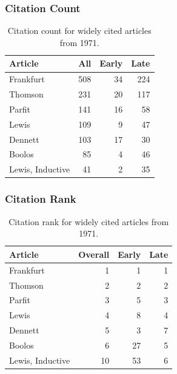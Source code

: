 \documentclass[
  10pt,
  letterpaper,
  DIV=11,
  numbers=noendperiod,
  twoside]{scrartcl}
\begin{document}
\subsubsection*{Citation Count}\label{sec-count-1971}

\begin{longtable}[]{@{}lrrr@{}}

\caption{\label{tbl-citation-count-1971}Citation count for widely cited
articles from 1971.}

\tabularnewline

\toprule\noalign{}
Article & All & Early & Late \\
\midrule\noalign{}
\endhead
\bottomrule\noalign{}
\endlastfoot
Frankfurt & 508 & 34 & 224 \\
Thomson & 231 & 20 & 117 \\
Parfit & 141 & 16 & 58 \\
Lewis & 109 & 9 & 47 \\
Dennett & 103 & 17 & 30 \\
Boolos & 85 & 4 & 46 \\
Lewis, Inductive & 41 & 2 & 35 \\

\end{longtable}

\subsubsection*{Citation Rank}\label{sec-rank-1971}

\begin{longtable}[]{@{}lrrr@{}}

\caption{\label{tbl-citation-rank-1971}Citation rank for widely cited
articles from 1971.}

\tabularnewline

\toprule\noalign{}
Article & Overall & Early & Late \\
\midrule\noalign{}
\endhead
\bottomrule\noalign{}
\endlastfoot
Frankfurt & 1 & 1 & 1 \\
Thomson & 2 & 2 & 2 \\
Parfit & 3 & 5 & 3 \\
Lewis & 4 & 8 & 4 \\
Dennett & 5 & 3 & 7 \\
Boolos & 6 & 27 & 5 \\
Lewis, Inductive & 10 & 53 & 6 \\

\end{longtable}
\end{document}
